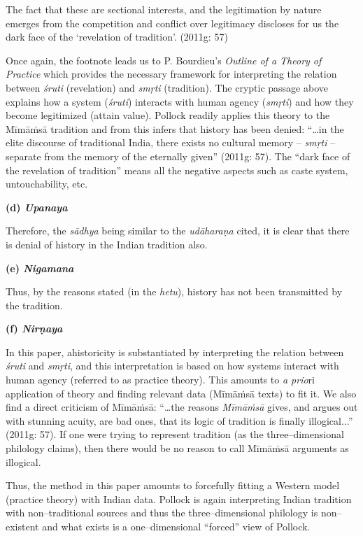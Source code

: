 \begin{myquote}
The fact that these are sectional interests, and the legitimation by nature emerges from the competition and conflict over legitimacy discloses for us the dark face of the ‘revelation of tradition’. (2011g: 57)
\end{myquote}

Once again, the footnote leads us to P. Bourdieu’s \textit{Outline of a Theory of Practice} which provides the necessary framework for interpreting the relation between \textit{śruti }(revelation) and \textit{smṛti} (tradition). The cryptic passage above explains how a system (\textit{śruti}) interacts with human agency (\textit{smṛti}) and how they become legitimized (attain value). Pollock readily applies this theory to the Mīmāṁsā tradition and from this infers that history has been denied: “…in the elite discourse of traditional India, there exists no cultural memory –\textit{ smṛti }– separate from the memory of the eternally given” (2011g: 57). The “dark face of the revelation of tradition” means all the negative aspects such as caste system, untouchability, etc.

\textbf{(d) \textit{Upanaya}}

Therefore, the \textit{sādhya} being similar to the \textit{udāharaṇa} cited, it is clear that there is denial of history in the Indian tradition also.

\textbf{(e) \textit{Nigamana}}

Thus, by the reasons stated (in the \textit{hetu}), history has not been transmitted by the tradition.

\textbf{(f) \textit{Nirṇaya}}

In this paper, ahistoricity is substantiated by interpreting the relation between \textit{śruti} and \textit{smṛti}, and this interpretation is based on how systems interact with human agency (referred to as practice theory). This amounts to \textit{a prio}ri application of theory and finding relevant data (Mīmāṁsā texts) to fit it. We also find a direct criticism of Mīmāṁsā: “…the reasons \textit{Mīmāṁsā} gives, and argues out with stunning acuity, are bad ones, that its logic of tradition is finally illogical...” (2011g: 57). If one were trying to represent tradition (as the three–dimensional philology claims), then there would be no reason to call Mīmāṁsā arguments as illogical.

\newpage

Thus, the method in this paper amounts to forcefully fitting a Western model (practice theory) with Indian data. Pollock is again interpreting Indian tradition with non–traditional sources and thus the three–dimensional philology is non–existent and what exists is a one–dimensional “forced” view of Pollock.

